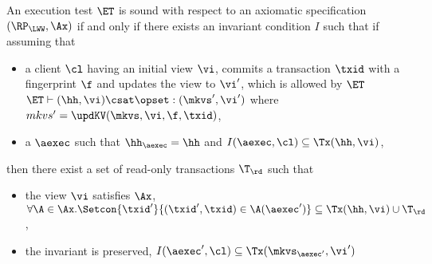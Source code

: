 \begin{definition}
\label{def:et_sound}
An execution test $\ET$ is sound with respect to an axiomatic 
specification $(\RP_{\LWW}, \Ax)$ if and only if
there exists an invariant condition $I$ such that 
if assuming that
\begin{itemize}
    \item a client \( \cl \) having an initial view \( \vi \), 
        commits a transaction \( \txid \) with a fingerprint \( \f \) and updates the view to \( \vi' \), 
        which is allowed by \( \ET \) \ie $\ET \vdash (\hh, \vi) \csat \opset: (\mkvs',\vi')$ where \( mkvs' = \updKV(\mkvs, \vi ,\f, \txid)\),
    \item a $\aexec$ such that $\hh_{\aexec} = \hh$ and $I(\aexec, \cl) \subseteq \Tx(\hh, \vi)$,
\end{itemize}
then there exist a set of read-only transactions $\T_{\rd}$ such that 
\begin{itemize}
\item the view \( \vi \) satisfies \( \Ax \), \ie $\forall \A \in \Ax. \Setcon{\txid' }{ (\txid', \txid) \in \A(\aexec')} \subseteq \Tx(\hh, \vi) \cup \T_{\rd}$, 
\item the invariant is preserved, \ie $I(\aexec', \cl) \subseteq \Tx(\mkvs_{\aexec'}, \vi')$
\end{itemize}
\end{definition}

